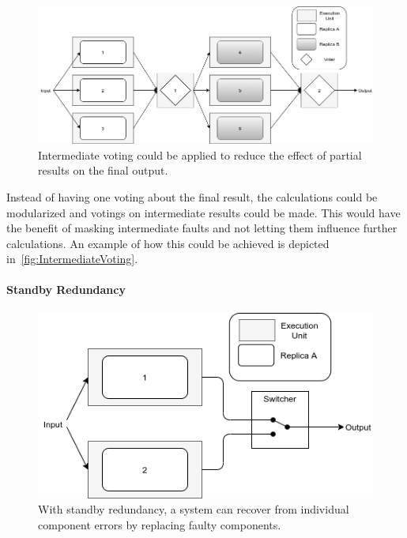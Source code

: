 \begin{figure}[!hb]
	\centering
	\includegraphics[width=0.75\linewidth]{images/IntermediateVoting}
	\caption{Intermediate voting could be applied to reduce the effect of partial results on the final output.}
	\label{fig:IntermediateVoting}
\end{figure}

Instead of having one voting about the final result, the calculations could be modularized and votings on intermediate results could be made.
This would have the benefit of masking intermediate faults and not letting them influence further calculations.
An example of how this could be achieved is depicted in~\autoref{fig:IntermediateVoting}.

\paragraph{Standby Redundancy}
\begin{figure}[!hb]
	\centering
	\includegraphics[width=0.75\linewidth]{images/ActiveSelectionRedundancy}
	\caption{With standby redundancy, a system can recover from individual component errors by replacing faulty components.}
	\label{fig:StandbyRedundancy}
\end{figure}

